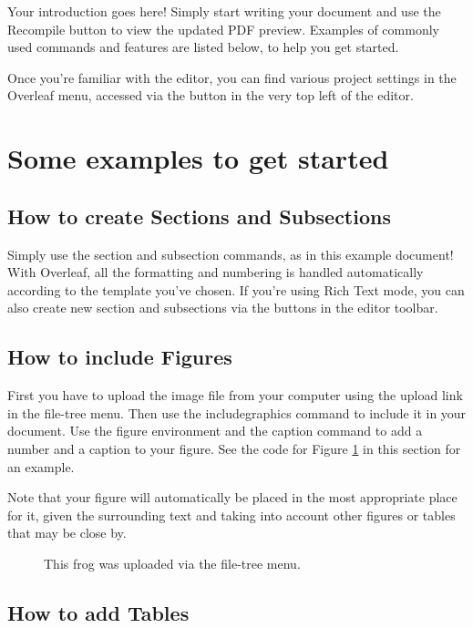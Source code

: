 \documentclass{article}
\begin{document}
Your introduction goes here! Simply start writing your document and use the Recompile button to view the updated PDF preview. Examples of commonly used commands and features are listed below, to help you get started.

Once you're familiar with the editor, you can find various project settings in the Overleaf menu, accessed via the button in the very top left of the editor.

\section{Some examples to get started}

\subsection{How to create Sections and Subsections}

Simply use the section and subsection commands, as in this example document! With Overleaf, all the formatting and numbering is handled automatically according to the template you've chosen. If you're using Rich Text mode, you can also create new section and subsections via the buttons in the editor toolbar.

\subsection{How to include Figures}

First you have to upload the image file from your computer using the upload link in the file-tree menu. Then use the includegraphics command to include it in your document. Use the figure environment and the caption command to add a number and a caption to your figure. See the code for Figure \ref{fig:frog} in this section for an example.

Note that your figure will automatically be placed in the most appropriate place for it, given the surrounding text and taking into account other figures or tables that may be close by.

\begin{figure}
\centering
\caption{\label{fig:frog}This frog was uploaded via the file-tree menu.}
\end{figure}

\subsection{How to add Tables}
\end{document}
